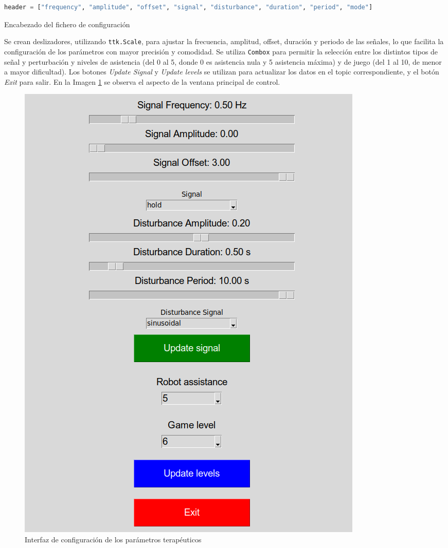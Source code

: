 \begin{code}[h]
\begin{lstlisting}[language=Python]
header = ["frequency", "amplitude", "offset", "signal", "disturbance", "duration", "period", "mode"]
\end{lstlisting}
\caption[Encabezado del fichero de configuración]{Encabezado del fichero de configuración}
\label{cod:codejemplo2}
\end{code}

Se crean deslizadores, utilizando \verb|ttk.Scale|, para ajustar la frecuencia, amplitud, offset, duración y periodo de las señales, lo que facilita la configuración de los parámetros con mayor precisión y comodidad.
Se utiliza \verb|Combox| para permitir la selección entre los distintos tipos de señal y perturbación y niveles de asistencia (del 0 al 5, donde 0 es asistencia nula y 5 asistencia máxima) y de juego (del 1 al 10, de menor a mayor dificultad).
Los botones \textit{Update Signal} y \textit{Update levels} se utilizan para actualizar los datos en el topic correspondiente, y el botón \textit{Exit} para salir.
En la Imagen \ref{fig:control} se observa el aspecto de la ventana principal de control.

\begin{figure}[ht!]
	\centering
	\begin{minipage}{0.55\linewidth}
		\centering
		\includegraphics[width=\linewidth]{figs/control_pannel.png}
	\end{minipage}
	\caption[Interfaz de configuración de los parámetros terapéuticos]{Interfaz de configuración de los parámetros terapéuticos}
	\label{fig:control}
\end{figure}


